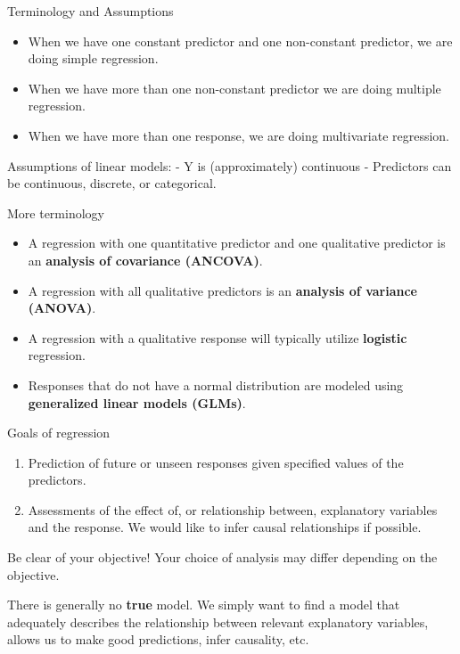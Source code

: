 \begin{frame}{Terminology and Assumptions}
\protect\hypertarget{terminology-and-assumptions}{}

\begin{itemize}
\tightlist
\item
  When we have one constant predictor and one non-constant predictor, we
  are doing simple regression.\\
\item
  When we have more than one non-constant predictor we are doing
  multiple regression.
\item
  When we have more than one response, we are doing multivariate
  regression.
\end{itemize}

Assumptions of linear models: - Y is (approximately) continuous -
Predictors can be continuous, discrete, or categorical.

\end{frame}

\begin{frame}{More terminology}
\protect\hypertarget{more-terminology}{}

\begin{itemize}
\tightlist
\item
  A regression with one quantitative predictor and one qualitative
  predictor is an \textbf{analysis of covariance (ANCOVA)}.
\item
  A regression with all qualitative predictors is an \textbf{analysis of
  variance (ANOVA)}.
\item
  A regression with a qualitative response will typically utilize
  \textbf{logistic} regression.
\item
  Responses that do not have a normal distribution are modeled using
  \textbf{generalized linear models (GLMs)}.
\end{itemize}

\end{frame}

\begin{frame}{Goals of regression}
\protect\hypertarget{goals-of-regression}{}

\begin{enumerate}
\tightlist
\item
  Prediction of future or unseen responses given specified values of the
  predictors.
\item
  Assessments of the effect of, or relationship between, explanatory
  variables and the response. We would like to infer causal
  relationships if possible.
\end{enumerate}

Be clear of your objective! Your choice of analysis may differ depending
on the objective.

There is generally no \textbf{true} model. We simply want to find a
model that adequately describes the relationship between relevant
explanatory variables, allows us to make good predictions, infer
causality, etc.

\end{frame}

